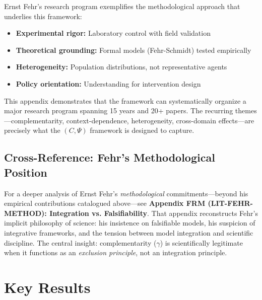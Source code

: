 Ernst Fehr's research program exemplifies the methodological approach
that underlies this framework:
\begin{itemize}
  \item \textbf{Experimental rigor:} Laboratory control with field validation
  \item \textbf{Theoretical grounding:} Formal models (Fehr-Schmidt) tested empirically
  \item \textbf{Heterogeneity:} Population distributions, not representative agents
  \item \textbf{Policy orientation:} Understanding for intervention design
\end{itemize}

This appendix demonstrates that the framework can systematically organize
a major research program spanning 15 years and 20+ papers. The recurring
themes---complementarity, context-dependence, heterogeneity, cross-domain
effects---are precisely what the $(C, \Psi)$ framework is designed to capture.

\subsection{Cross-Reference: Fehr's Methodological Position}

For a deeper analysis of Ernst Fehr's \textit{methodological} commitments---beyond
his empirical contributions catalogued above---see \textbf{Appendix FRM (LIT-FEHR-METHOD):
Integration vs. Falsifiability}. That appendix reconstructs Fehr's implicit philosophy
of science: his insistence on falsifiable models, his suspicion of integrative frameworks,
and the tension between model integration and scientific discipline. The central insight:
complementarity ($\gamma$) is scientifically legitimate when it functions as an
\textit{exclusion principle}, not an integration principle.




\section{Key Results}
\label{sec:feh-results}

